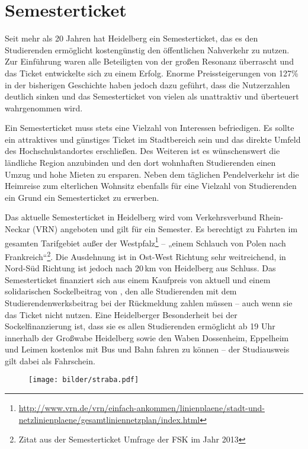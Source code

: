 
\section{Semesterticket}
Seit mehr als 20 Jahren hat Heidelberg ein Semesterticket, das es den Studierenden ermöglicht kostengünstig den öffentlichen Nahverkehr zu nutzen. Zur Einführung waren alle Beteiligten von der großen Resonanz überrascht und das Ticket entwickelte sich zu einem Erfolg. Enorme Preissteigerungen von 127\% in der bisherigen Geschichte haben jedoch dazu geführt, dass die Nutzerzahlen deutlich sinken und das Semesterticket von vielen als unattraktiv und überteuert wahrgenommen wird.

Ein Semesterticket muss stets eine Vielzahl von Interessen befriedigen. Es sollte ein attraktives und günstiges Ticket im Stadtbereich sein und das direkte Umfeld des Hochschulstandortes erschließen. Des Weiteren ist es wünschenswert die ländliche Region anzubinden und den dort wohnhaften Studierenden einen Umzug und hohe Mieten zu ersparen. Neben dem täglichen Pendelverkehr ist die Heimreise zum elterlichen Wohnsitz ebenfalls für eine Vielzahl von Studierenden ein Grund ein Semesterticket zu erwerben.

Das aktuelle Semesterticket in Heidelberg wird vom Verkehrsverbund Rhein-Neckar (VRN) angeboten und gilt für ein Semester. Es berechtigt zu Fahrten im gesamten Tarifgebiet außer der Westpfalz\footnote{\url{http://www.vrn.de/vrn/einfach-ankommen/linienplaene/stadt-und-netzlinienplaene/gesamtliniennetzplan/index.html}} -- „einem Schlauch von Polen nach Frankreich“\footnote{Zitat aus der Semesterticket Umfrage der FSK im Jahr 2013}. Die Ausdehnung ist in Ost-West Richtung sehr weitreichend, in Nord-Süd Richtung ist jedoch nach 20\,km von Heidelberg aus Schluss. Das Semesterticket finanziert sich aus einem Kaufpreis von aktuell \EUR{\semesterticket} und einem solidarischen Sockelbeitrag von \EUR{\sockelbeitrag}, den alle Studierenden mit dem Studierendenwerksbeitrag bei der Rückmeldung zahlen müssen -- auch wenn sie das Ticket nicht nutzen. Eine Heidelberger Besonderheit bei der Sockelfinanzierung ist, dass sie es allen Studierenden ermöglicht ab 19 Uhr innerhalb der Großwabe Heidelberg sowie den Waben Dossenheim, Eppelheim und Leimen kostenlos mit Bus und Bahn fahren zu können -- der Studiausweis gilt dabei als Fahrschein.

\begin{figure}[b]
    \centering
    \texttt{[image: bilder/straba.pdf]}
\end{figure}

